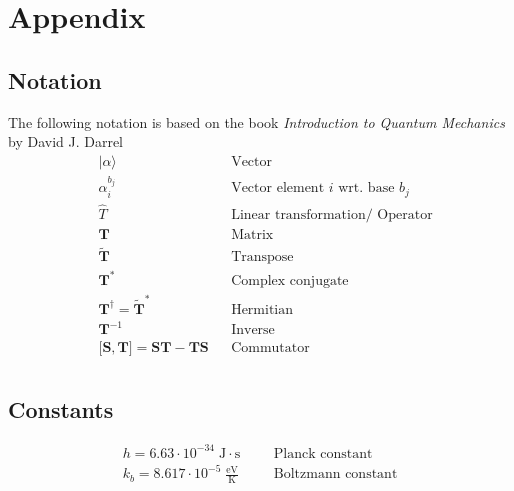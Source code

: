 \section{Appendix}
\subsection{Notation}
The following notation is based on the book \textit{Introduction to Quantum Mechanics} by David J. Darrel
\begin{align*}
     & \lvert \alpha \rangle                                             &  & \text{Vector}                             \\
     & \alpha_i^{b_j}                                                    &  & \text{Vector element $i$ wrt.\ base } b_j \\
     & \hat{T}                                                           &  & \text{Linear transformation/ Operator}    \\
     & \mathbf{T}                                                        &  & \text{Matrix}                             \\
     & \widetilde{\mathbf{T}}                                            &  & \text{Transpose}                          \\
     & \mathbf{T}^*                                                      &  & \text{Complex conjugate}                  \\
     & \mathbf{T}^\dagger = {\widetilde{\mathbf{T}}}^*                   &  & \text{Hermitian}                          \\
     & \mathbf{T}^{-1}                                                   &  & \text{Inverse}                            \\
     & \lbrack \mathbf{S},\mathbf{T} \rbrack = \mathbf{ST} - \mathbf{TS} &  & \text{Commutator}                         \\
\end{align*}

\subsection{Constants}
\noindent\begin{align*}
    h = 6.63 \cdot 10^{-34} \;\mathrm{J\cdot s}      &  &  & \text{Planck constant}    \\
    k_b =8.617 \cdot 10^{-5} \;\mathrm{\frac{eV}{K}} &  &  & \text{Boltzmann constant}
\end{align*}

